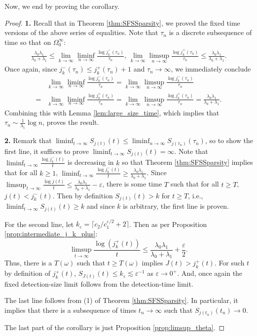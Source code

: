 \documentclass{article}
\numberwithin{equation}{section}
\begin{document}
Now, we end by proving the corollary.
\SFSSparsityCor*
\begin{proof}
    \textbf{1.} Recall that in Theorem \ref{thm:SFSSparsity}, we proved the fixed time versions of the above series of equalities. Note that $\tau_n$ is a discrete subsequence of time so that on $\Omega_0^\infty$:
    \begin{align*}
        \frac{\lambda_0\lambda_1}{\lambda_0+\lambda_1}\leq \lim_{k\to\infty}\liminf_{n\to\infty}\frac{\log j_k^-(\tau_n)}{\tau_n},\, \lim_{k\to\infty}\limsup_{n\to\infty}\frac{\log j_k^+(\tau_n)}{\tau_n}\leq  \frac{\lambda_0\lambda_1}{\lambda_0+\lambda_1}.
    \end{align*}
    Once again, since $j_k^-(\tau_n)\leq j_k^+(\tau_n)+1$ and $\tau_n\to\infty$, we immediately conclude
    \begin{align*}
        &\lim_{k\to\infty}\liminf_{n\to\infty}\frac{\log j_k^-(\tau_n)}{\tau_n}=\lim_{k\to\infty}\limsup_{n\to\infty}\frac{\log j_k^-(\tau_n)}{\tau_n}\\
        =&\lim_{k\to\infty}\liminf_{n\to\infty}\frac{\log j_k^+(\tau_n)}{\tau_n}=\lim_{k\to\infty}\limsup_{n\to\infty}\frac{\log j_k^+(\tau_n)}{\tau_n}=\frac{\lambda_0\lambda_1}{\lambda_0+\lambda_1}.
    \end{align*}
Combining this with Lemma \ref{lem:large_size_time}, which implies that $\tau_n\sim \frac{1}{\lambda_1}\log n$, proves the result.

    \textbf{2.} Remark that $\liminf_{t\to\infty}S_{j(t)}(t)\leq \liminf_{n\to\infty}S_{j(\tau_n)}(\tau_n)$, so to show the first line, it suffices to prove $\liminf_{t\to\infty}S_{j(t)}(t)=\infty$. Note that $\liminf_{t\to\infty}\frac{\log j_k^-(t)}{t}$ is decreasing in $k$ so that Theorem \ref{thm:SFSSparsity} implies that for all $k\geq 1$, $\liminf_{t\to\infty}\frac{\log j_k^-(t)}{t}\geq \frac{\lambda_0\lambda_1}{\lambda_0+\lambda_1}$. Since $\limsup_{t\to\infty}\frac{\log j(t)}{t}\leq \frac{\lambda_0\lambda_1}{\lambda_0+\lambda_1}-\varepsilon$, there is some time $T$ such that for all $t\geq T$, $j(t)<j_k^-(t)$. Then by definition $S_{j(t)}(t)>k$ for $t\geq T$, i.e., $\liminf_{t\to\infty}S_{j(t)}(t)\geq k$ and since $k$ is arbitrary, the first line is proven.

    For the second line, let $k_\varepsilon=\lceil c_2/c_1^{\varepsilon/2}+2\rceil$. Then as per Proposition \ref{prop:intermediate_j_k_plus}:
    \[\limsup_{t\to\infty}\frac{\log(j_k^+(t))}{t}\leq \frac{\lambda_0\lambda_1}{\lambda_0+\lambda_1}+\frac{\varepsilon}{2}.\]
    Thus, there is a $T(\omega)$ such that $t\geq T(\omega)$ implies $J(t)>j_k^+(t)$. For such $t$ by definition of $j_k^+(t)$, $S_{J(t)}(t)\leq k_\varepsilon\lesssim\varepsilon^{-1}$ as $\varepsilon\to 0^+$. And, once again the fixed detection-size limit follows from the detection-time limit.

    The last line follows from (1) of Theorem \ref{thm:SFSSparsity}. In particular, it implies that there is a subsequence of times $t_n\to \infty$ such that $S_{j(t_n)}(t_n)\to 0$.

    The last part of the corollary is just Proposition \ref{prop:limsup_theta}.
\end{proof}
\end{document}
